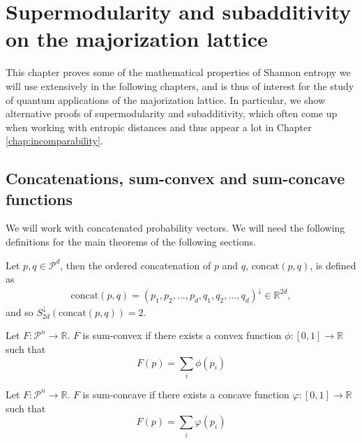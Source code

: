 \chapter{Supermodularity and subadditivity on the majorization lattice} \label{chap:alternative}

This chapter proves some of the mathematical properties of Shannon entropy we will use extensively in the following chapters, and is thus of interest for the study of quantum applications of the majorization lattice. In particular, we show alternative proofs of supermodularity and subadditivity, which often come up when working with entropic distances and thus appear a lot in Chapter \ref{chap:incomparability}.

\section{Concatenations, sum-convex and sum-concave functions}

We will work with concatenated probability vectors. We will need the following definitions for the main theorems of the following sections.

\begin{definition} \label{def:concatenation}
    Let $p, q \in \mathcal{P}^d$, then the ordered concatenation of $p$ and $q$, $\text{concat}(p, q)$, is defined as
    \begin{align}
        \text{concat}(p, q) = (p_1, p_2, ..., p_d, q_1, q_2, ..., q_d)^\downarrow \in \mathbb{R}^{2d},
    \end{align}
    and so $S^\downarrow_{2d}(\text{concat}(p, q)) = 2$.
\end{definition}

\begin{definition} \label{def:sum-convex} %
    Let $F: \mathcal{P}^n \rightarrow \mathbb{R}$. $F$ is sum-convex if there exists a convex function $\phi: [0, 1] \rightarrow \mathbb{R}$ such that
    \begin{equation} \label{eq:sum-convex}
        F(p) = \sum_i \phi(p_i)
    \end{equation}
\end{definition}

\begin{definition} \label{def:sum-concave} %
    Let $F: \mathcal{P}^n \rightarrow \mathbb{R}$. $F$ is sum-concave if there exists a concave function $\varphi: [0, 1] \rightarrow \mathbb{R}$ such that
    \begin{equation} \label{eq:sum-concave}
        F(p) = \sum_i \varphi(p_i)
    \end{equation}
\end{definition}

